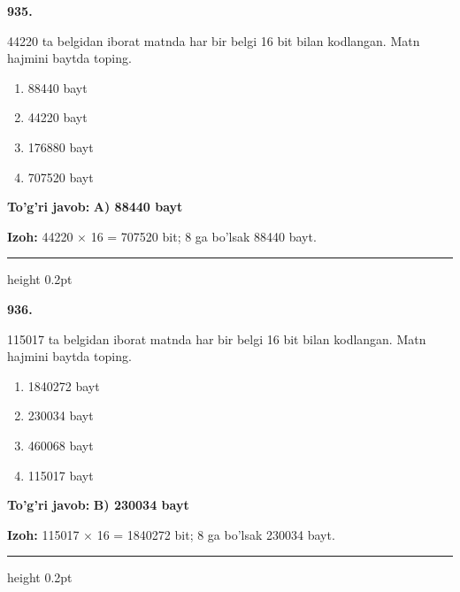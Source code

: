 \documentclass[10pt,a4paper,oneside]{article}
\begin{document}
\noindent\textbf{\color{ink}935.}
\par
44220 ta belgidan iborat matnda har bir belgi 16 bit bilan kodlangan. Matn hajmini baytda toping.
\begin{enumerate}[label=\Alph*),leftmargin=9mm]
\item 88440 bayt
\item 44220 bayt
\item 176880 bayt
\item 707520 bayt
\end{enumerate}
\begin{tcolorbox}[enhanced,breakable,colback=teal!4,colframe=teal!50!black,boxrule=0.5pt,arc=1.1mm,left=3mm,right=3mm,top=1.7mm,bottom=1.7mm,before skip=2mm,after skip=2mm]
\textbf{\color{teal}To'g'ri javob:} \textbf{A) 88440 bayt}
\par\smallskip
\textbf{Izoh:} 44220 \ensuremath{\times} 16 = 707520 bit; 8 ga bo'lsak 88440 bayt.
\end{tcolorbox}
\vspace{2mm}\hrule height 0.2pt \vspace{3mm}

\noindent\textbf{\color{ink}936.}
\par
115017 ta belgidan iborat matnda har bir belgi 16 bit bilan kodlangan. Matn hajmini baytda toping.
\begin{enumerate}[label=\Alph*),leftmargin=9mm]
\item 1840272 bayt
\item 230034 bayt
\item 460068 bayt
\item 115017 bayt
\end{enumerate}
\begin{tcolorbox}[enhanced,breakable,colback=teal!4,colframe=teal!50!black,boxrule=0.5pt,arc=1.1mm,left=3mm,right=3mm,top=1.7mm,bottom=1.7mm,before skip=2mm,after skip=2mm]
\textbf{\color{teal}To'g'ri javob:} \textbf{B) 230034 bayt}
\par\smallskip
\textbf{Izoh:} 115017 \ensuremath{\times} 16 = 1840272 bit; 8 ga bo'lsak 230034 bayt.
\end{tcolorbox}
\vspace{2mm}\hrule height 0.2pt \vspace{3mm}
\end{document}
